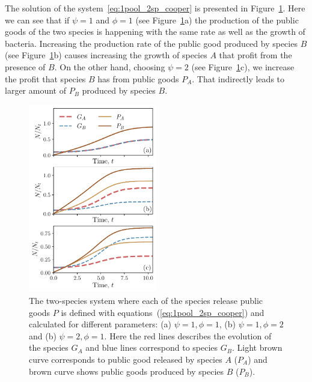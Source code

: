 \documentclass[10pt,A4paper]{article}
\numberwithin{equation}{section}
\begin{document}
%
The solution of the system~\ref{eq:1pool_2sp_cooper} is presented in Figure~\ref{fig:1pool_2sp_cooper}.
Here we can see that if $\psi=1$ and $\phi=1$ (see Figure~\ref{fig:1pool_2sp_cooper}a) the production of the public goods of the two species is happening with the same rate as well as the growth of bacteria.
Increasing the production rate of the public good produced by species $B$ (see Figure~\ref{fig:1pool_2sp_cooper}b) causes increasing the growth of species $A$ that profit from the presence of $B$.
On the other hand, choosing $\psi=2$ (see Figure~\ref{fig:1pool_2sp_cooper}c), we increase the profit that species $B$ has from public goods $P_A$.
That indirectly leads to larger amount of $P_B$ produced by species $B$.
\begin{figure}[H]
    \begin{center}
    \includegraphics[width=0.5\textwidth]{Figures/pool_model_2sp_1pool_coop.pdf}
    \caption{
        The two-species system where each of the species release public goods $P$ is defined with equations~(\ref{eq:1pool_2sp_cooper}) and calculated for different parameters:
        (a) $\psi=1, \phi=1$, (b) $\psi=1, \phi=2$ and (b) $\psi=2, \phi=1$.
        Here the red lines describes the evolution of the species $G_A$ and blue lines correspond to species $G_B$.
        Light brown curve corresponds to public good released by species $A$ ($P_A$) and brown curve shows public goods produced by species $B$ ($P_B$).
    }
    \label{fig:1pool_2sp_cooper}
    \end{center}
\end{figure}

\end{document}
